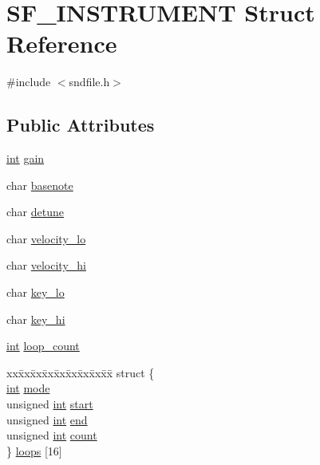 \hypertarget{struct_s_f___i_n_s_t_r_u_m_e_n_t}{}\section{S\+F\+\_\+\+I\+N\+S\+T\+R\+U\+M\+E\+NT Struct Reference}
\label{struct_s_f___i_n_s_t_r_u_m_e_n_t}


{\ttfamily \#include $<$sndfile.\+h$>$}

\subsection*{Public Attributes}
\begin{DoxyCompactItemize}
\item 
\hyperlink{xmltok_8h_a5a0d4a5641ce434f1d23533f2b2e6653}{int} \hyperlink{struct_s_f___i_n_s_t_r_u_m_e_n_t_a1c157f314b852c291150feab66f1f7fe}{gain}
\item 
char \hyperlink{struct_s_f___i_n_s_t_r_u_m_e_n_t_ab131f2d1e1297b20b9b64596bd9fef2c}{basenote}
\item 
char \hyperlink{struct_s_f___i_n_s_t_r_u_m_e_n_t_a15c6ebfa70d434dae34742c58a8ef9bf}{detune}
\item 
char \hyperlink{struct_s_f___i_n_s_t_r_u_m_e_n_t_a3637643126becba84608741033f91f47}{velocity\+\_\+lo}
\item 
char \hyperlink{struct_s_f___i_n_s_t_r_u_m_e_n_t_a4e1435a98a085a8df95f10ff1bed536f}{velocity\+\_\+hi}
\item 
char \hyperlink{struct_s_f___i_n_s_t_r_u_m_e_n_t_a9c59a466ad6937c6d6a5134a642aae6c}{key\+\_\+lo}
\item 
char \hyperlink{struct_s_f___i_n_s_t_r_u_m_e_n_t_ac5d3d85d2218849b73620cb1a70ea609}{key\+\_\+hi}
\item 
\hyperlink{xmltok_8h_a5a0d4a5641ce434f1d23533f2b2e6653}{int} \hyperlink{struct_s_f___i_n_s_t_r_u_m_e_n_t_a070427d027c390e850951c83bda44d07}{loop\+\_\+count}
\item 
\begin{tabbing}
xx\=xx\=xx\=xx\=xx\=xx\=xx\=xx\=xx\=\kill
struct \{\\
\>\hyperlink{xmltok_8h_a5a0d4a5641ce434f1d23533f2b2e6653}{int} \hyperlink{struct_s_f___i_n_s_t_r_u_m_e_n_t_af222d1a939525fe44aa377ff764570be}{mode}\\
\>unsigned \hyperlink{xmltok_8h_a5a0d4a5641ce434f1d23533f2b2e6653}{int} \hyperlink{struct_s_f___i_n_s_t_r_u_m_e_n_t_a4053f5d0ec83a281264dfd9c17ae921c}{start}\\
\>unsigned \hyperlink{xmltok_8h_a5a0d4a5641ce434f1d23533f2b2e6653}{int} \hyperlink{struct_s_f___i_n_s_t_r_u_m_e_n_t_aaae008f486b2db6b71564456736634a2}{end}\\
\>unsigned \hyperlink{xmltok_8h_a5a0d4a5641ce434f1d23533f2b2e6653}{int} \hyperlink{struct_s_f___i_n_s_t_r_u_m_e_n_t_af1a76686638c1d4d722a543cc09ca9bc}{count}\\
\} \hyperlink{struct_s_f___i_n_s_t_r_u_m_e_n_t_a25418774ca66b71c4ad29dd5070434da}{loops} \mbox{[}16\mbox{]}\\


\end{tabbing}
\end{DoxyCompactItemize}
